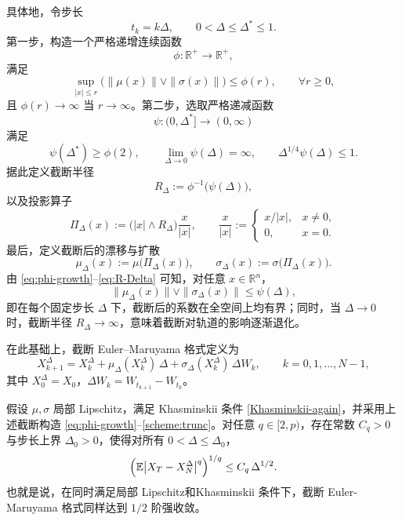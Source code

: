 	具体地，令步长
	\[
	t_k = k\Delta,\qquad 0<\Delta\le\Delta^\ast\le1.
	\]
	第一步，构造一个严格递增连续函数
	\[
	\phi:\mathbb{R}^+\to\mathbb{R}^+,
	\]
	满足
	\begin{equation}\label{eq:phi-growth}
		\sup_{|x|\le r}\bigl(\|\mu(x)\|\vee\|\sigma(x)\|\bigr)\le \phi(r),
		\qquad \forall r\ge0,
	\end{equation}
	且 $\phi(r)\to\infty$ 当 $r\to\infty$。第二步，选取严格递减函数
	\[
	\psi:(0,\Delta^\ast]\to(0,\infty)
	\]
	满足
	\begin{equation}\label{eq:psi-cond}
		\psi(\Delta^\ast)\ge\phi(2),\qquad
		\lim_{\Delta\to0}\psi(\Delta)=\infty,\qquad
		\Delta^{1/4}\psi(\Delta)\le1.
	\end{equation}
	据此定义截断半径
	\begin{equation}\label{eq:R-Delta}
		R_\Delta := \phi^{-1}\!\bigl(\psi(\Delta)\bigr),
	\end{equation}
	以及投影算子
	\begin{equation}\label{eq:Pi-Delta}
		\Pi_\Delta(x)
		:=\bigl(|x|\wedge R_\Delta\bigr)\frac{x}{|x|},
		\qquad
		\frac{x}{|x|}:=
		\begin{cases}
			x/|x|, & x\neq0,\\[0.3em]
			0, & x=0.
		\end{cases}
	\end{equation}
	最后，定义截断后的漂移与扩散
	\begin{equation}\label{eq:trunc-coeff}
		\mu_\Delta(x):=\mu\bigl(\Pi_\Delta(x)\bigr),\qquad
		\sigma_\Delta(x):=\sigma\bigl(\Pi_\Delta(x)\bigr).
	\end{equation}
	由 \eqref{eq:phi-growth}--\eqref{eq:R-Delta} 可知，对任意 $x\in\mathbb{R}^n$，
	\[
	\|\mu_\Delta(x)\|\vee\|\sigma_\Delta(x)\|
	\le \psi(\Delta),
	\]
	即在每个固定步长 $\Delta$ 下，截断后的系数在全空间上均有界；同时，当 $\Delta\to0$ 时，截断半径 $R_\Delta\to\infty$，意味着截断对轨道的影响逐渐退化。
	
	在此基础上，截断 Euler--Maruyama 格式定义为
	\begin{equation}\label{scheme:trunc}
		X_{k+1}^{\Delta}
		= X_k^{\Delta}
		+ \mu_\Delta(X_k^{\Delta})\,\Delta
		+ \sigma_\Delta(X_k^{\Delta})\,\Delta W_k,\qquad k=0,1,\dots,N-1,
	\end{equation}
	其中 $X_0^{\Delta}=X_0$，$\Delta W_k=W_{t_{k+1}}-W_{t_k}$。
	
	\begin{theorem}
		假设 $\mu,\sigma$ 局部 Lipschitz，满足 Khasminskii 条件 \eqref{Khasminskii-again}，并采用上述截断构造 \eqref{eq:phi-growth}--\eqref{scheme:trunc}。对任意 $q\in[2,p)$，存在常数 $C_q>0$ 与步长上界 $\Delta_0>0$，使得对所有 $0<\Delta\le\Delta_0$，
		\begin{equation}\label{eq:trunc-strong}
			\Bigl(\mathbb{E}\bigl|X_T - X_N^{\Delta}\bigr|^q\Bigr)^{1/q}
			\le C_q\,\Delta^{1/2}.
		\end{equation}
		也就是说，在同时满足局部 Lipschitz和Khasminskii 条件下，截断 Euler-Maruyama 格式同样达到 $1/2$ 阶强收敛。
	\end{theorem}
	

